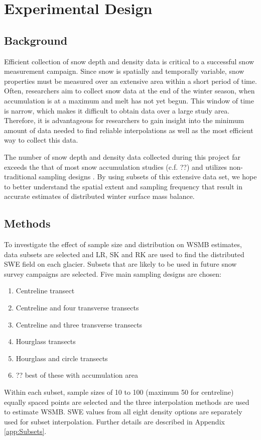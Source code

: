 \documentclass[12pt]{article}
\begin{document}
\section{Experimental Design}
\label{sec:experimentaldesign}

\subsection{Background}

Efficient collection of snow depth and density data is critical to a successful snow measurement campaign. Since snow is spatially and temporally variable, snow properties must be measured over an extensive area within a short period of time. Often, researchers aim to collect snow data at the end of the winter season, when accumulation is at a maximum and melt has not yet begun. This window of time is narrow, which makes it difficult to obtain data over a large study area. Therefore, it is advantageous for researchers to gain insight into the minimum amount of data needed to find reliable interpolations as well as the most efficient way to collect this data. 

The number of snow depth and density data collected during this project far exceeds the that of most snow accumulation studies (c.f. ??) and utilizes non-traditional sampling designs \citep{Shea2010}. By using subsets of this extensive data set, we hope to better understand the spatial extent and sampling frequency that result in accurate estimates of distributed winter surface mass balance.  

\subsection{Methods}
\label{sec:experimentaldesign_methods}

To investigate the effect of sample size and distribution on WSMB estimates, data subsets are selected and LR, SK and RK are used to find the distributed SWE field on each glacier. Subsets that are likely to be used in future snow survey campaigns are selected. Five main sampling designs are chosen:
\begin{enumerate}
\item Centreline transect
\item Centreline and four transverse transects
\item Centreline and three transverse transects
\item Hourglass transects
\item Hourglass and circle transects
\item ?? best of these with accumulation area
\end{enumerate}
Within each subset, sample sizes of 10 to 100 (maximum 50 for centreline) equally spaced points are selected and the three interpolation methods are used to estimate WSMB. SWE values from all eight density options are separately used for subset interpolation. Further details are described in Appendix \ref{app:Subsets}. 
\end{document}

